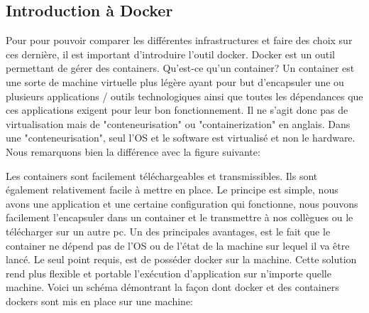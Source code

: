 \documentclass[
    iai, %
    il, %
]{heig-tb}
\begin{document}
\subsection{Introduction à Docker}
Pour pour pouvoir comparer les différentes infrastructures et faire des choix sur ces dernière, il est important d'introduire l'outil \Gls{docker}.\newline
Docker est un outil permettant de gérer des containers.\newline
Qu'est-ce qu'un container? Un container est une sorte de machine virtuelle plus légère ayant pour but d'encapsuler une ou plusieurs applications / outils technologiques ainsi que toutes les dépendances que ces applications exigent pour leur bon fonctionnement.\newline
Il ne s'agit donc pas de virtualisation mais de "conteneurisation" ou "containerization" en anglais.
Dans une "conteneurisation", seul l'OS et le software est virtualisé et non le hardware.\newline
Nous remarquons bien la différence avec la figure suivante: %

Les containers sont facilement téléchargeables et transmissibles. Ils sont également relativement facile à mettre en place.\newline
Le principe est simple, nous avons une application et une certaine configuration qui fonctionne, nous pouvons facilement l'encapsuler dans un container et le transmettre à nos collègues ou le télécharger sur un autre pc.\newline
Un des principales avantages, est le fait que le container ne dépend pas de l'OS ou de l'état de la machine sur lequel il va être lancé.\newline
Le seul point requis, est de posséder docker sur la machine.\newline
Cette solution rend plus flexible et portable l'exécution d'application sur n'importe quelle machine.\newline
Voici un schéma démontrant la façon dont docker et des containers dockers sont mis en place sur une machine: %
\end{document}

